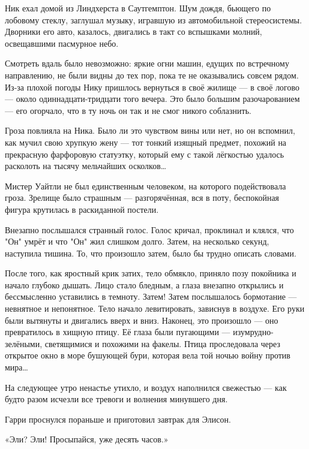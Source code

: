 \documentclass[a4paper,12pt]{book}
\begin{document}
\par
Ник ехал домой из Линдхерста в Саутгемптон. Шум дождя, бьющего по лобовому стеклу, заглушал музыку, игравшую из автомобильной стереосистемы. Дворники его авто, казалось, двигались в такт со вспышками молний, освещавшими пасмурное небо.
\par
Смотреть вдаль было невозможно: яркие огни машин, едущих по встречному направлению, не были видны до тех пор, пока те не оказывались совсем рядом. Из-за плохой погоды Нику пришлось вернуться в своё жилище — в своё логово — около одиннадцати-тридцати того вечера. Это было большим разочарованием — его огорчало, что в ту ночь он так и не смог никого соблазнить.
\par
Гроза повлияла на Ника. Было ли это чувством вины или нет, но он вспомнил, как мучил свою хрупкую жену — тот тонкий изящный предмет, похожий на прекрасную фарфоровую статуэтку, который ему с такой лёгкостью удалось расколоть на тысячу мельчайших осколков…\\
\par
Мистер Уайтли не был единственным человеком, на которого подействовала гроза. Зрелище было страшным — разгорячённая, вся в поту, беспокойная фигура крутилась в раскиданной постели.
\par
Внезапно послышался странный голос. Голос кричал, проклинал и клялся, что "Он" умрёт и что "Он" жил слишком долго. Затем, на несколько секунд, наступила тишина. То, что произошло затем, было бы трудно описать словами.
\par
После того, как яростный крик затих, тело обмякло, приняло позу покойника и начало глубоко дышать. Лицо стало бледным, а глаза внезапно открылись и бессмысленно уставились в темноту. Затем! Затем послышалось бормотание — невнятное и непонятное. Тело начало левитировать, зависнув в воздухе. Его руки были вытянуты и двигались вверх и вниз. Наконец, это произошло — оно превратилось в хищную птицу. Её глаза были пугающими — изумрудно-зелёными, светящимися и похожими на факелы. Птица проследовала через открытое окно в море бушующей бури, которая вела той ночью войну против мира…\\
\par
На следующее утро ненастье утихло, и воздух наполнился свежестью — как будто разом исчезли все тревоги и волнения минувшего дня.
\par
Гарри проснулся пораньше и приготовил завтрак для Элисон.\\
\par
«Эли? Эли! Просыпайся, уже десять часов.»
\par
\end{document}
